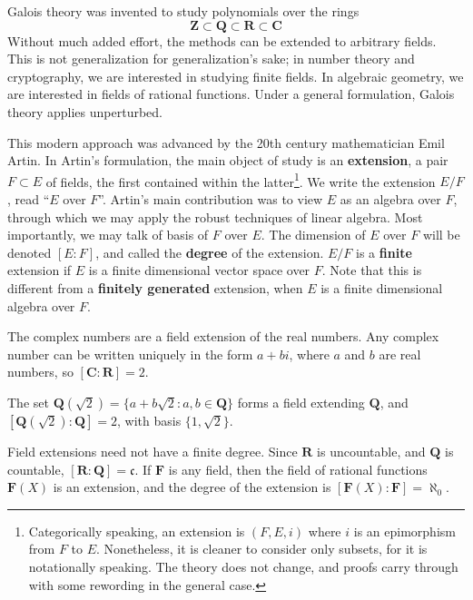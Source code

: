 Galois theory was invented to study polynomials over the rings
%
\[ \mathbf{Z} \subset \mathbf{Q} \subset \mathbf{R} \subset \mathbf{C} \]
%
Without much added effort, the methods can be extended to arbitrary fields. This is not generalization for generalization's sake; in number theory and cryptography, we are interested in studying finite fields. In algebraic geometry, we are interested in fields of rational functions. Under a general formulation, Galois theory applies unperturbed.

This modern approach was advanced by the 20th century mathematician Emil Artin. In Artin's formulation, the main object of study is an {\bf extension}, a pair $F \subset E$ of fields, the first contained within the latter\footnote{Categorically speaking, an extension is $(F,E,i)$ where $i$ is an epimorphism from $F$ to $E$. Nonetheless, it is cleaner to consider only subsets, for it is notationally speaking. The theory does not change, and proofs carry through with some rewording in the general case.}. We write the extension $E/F$, read ``$E$ over $F$''. Artin's main contribution was to view $E$ as an algebra over $F$, through which we may apply the robust techniques of linear algebra. Most importantly, we may talk of basis of $F$ over $E$. The dimension of $E$ over $F$ will be denoted $[E:F]$, and called the {\bf degree} of the extension. $E/F$ is a {\bf finite} extension if $E$ is a finite dimensional vector space over $F$. Note that this is different from a {\bf finitely generated} extension, when $E$ is a finite dimensional algebra over $F$.

\begin{example}
    The complex numbers are a field extension of the real numbers. Any complex number can be written uniquely in the form $a + bi$, where $a$ and $b$ are real numbers, so $[\mathbf{C}: \mathbf{R}] = 2$.
\end{example}

\begin{example}
    The set $\mathbf{Q}(\sqrt{2}) = \{ a + b \sqrt{2} : a,b \in \mathbf{Q} \}$ forms a field extending $\mathbf{Q}$, and $[\mathbf{Q}(\sqrt{2}): \mathbf{Q}] = 2$, with basis $\{ 1, \sqrt{2} \}$.
\end{example}

\begin{example}
    Field extensions need not have a finite degree. Since $\mathbf{R}$ is uncountable, and $\mathbf{Q}$ is countable, $[\mathbf{R}: \mathbf{Q}] = \mathfrak{c}$. If $\mathbf{F}$ is any field, then the field of rational functions $\mathbf{F}(X)$ is an extension, and the degree of the extension is $[\mathbf{F}(X) : \mathbf{F}] = \aleph_0$.
\end{example}

